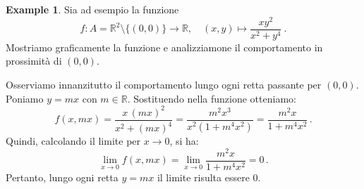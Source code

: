 \documentclass{article}
\theoremstyle{plain}
\theoremstyle{definition}
\newtheorem{exmp}{Example}[section]
\theoremstyle{remark}
\begin{document}
\vspace{10pt}

\begin{exmp}
    Sia ad esempio la funzione
    \[
    f\colon A=\mathbb{R}^2\setminus\{(0,0)\}\to\mathbb{R},\quad (x,y)\mapsto \frac{xy^2}{x^2+y^4}~.
    \]
    Mostriamo graficamente la funzione e analizziamone il comportamento in prossimità di \((0,0)\).

    \begin{center}
        \hspace{1cm}
    \end{center}

    Osserviamo innanzitutto il comportamento lungo ogni retta passante per \((0,0)\). Poniamo \(y=mx\) con \(m\in\mathbb{R}\). Sostituendo nella funzione otteniamo:
    \[
    f(x,mx)=\frac{x\,(mx)^2}{x^2+(mx)^4}=\frac{m^2 x^3}{x^2(1+m^4 x^2)}=\frac{m^2 x}{1+m^4 x^2}\,.
    \]
    Quindi, calcolando il limite per \(x\to0\), si ha:
    \[
    \lim_{x\to0} f(x,mx)=\lim_{x\to0}\frac{m^2 x}{1+m^4 x^2}=0\,.
    \]
    Pertanto, lungo ogni retta \(y=mx\) il limite risulta essere \(0\).


\end{exmp}
\end{document}
